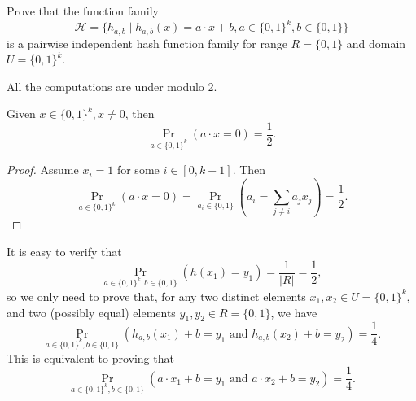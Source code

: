 \documentclass{homework}
\begin{document}
\begin{problem}
  Prove that the function family
  \begin{equation*}
    \mathcal{H} = \bigl\{ h_{a,b} \mid h_{a,b}(x) = a \cdot x + b, a\in {\{0,1\}}^{k},
    b\in \{0,1\} \bigr\}
  \end{equation*}
  is a pairwise independent hash function family for range $R = \{0,1\}$ and
  domain $U = {\{0,1\}}^{k}$.
\end{problem}

\begin{solution}

  All the computations are under modulo 2.

  \begin{lemma}
    Given $x \in \{0, 1\}^k, x \neq 0$, then
    \begin{equation*}
      \Pr_{a \in \{0, 1\}^k}(a \cdot x = 0) = \frac{1}{2}.
    \end{equation*}
  \end{lemma}

  \begin{proof}
    Assume $x_i = 1$ for some $i \in [0, k - 1]$. Then
    \begin{equation*}
      \Pr_{a \in \{0, 1\}^k}(a \cdot x = 0) = \Pr_{a_i \in \{0, 1\}}(a_i = \sum_{j \neq i}a_jx_j) = \frac{1}{2}.
    \end{equation*}
    \hfill\qedsymbol
  \end{proof}

  It is easy to verify that
  \begin{equation*}
    \Pr_{a \in \{0, 1\}^k, b \in \{0, 1\}}(h(x_1) = y_1) = \frac{1}{|R|} = \frac{1}{2},
  \end{equation*}
  so we only need to prove that, for any two distinct elements $x_1, x_2 \in U = \{0, 1\}^k$,
  and two (possibly equal) elements $y_1, y_2 \in R = \{0, 1\}$, we have
  \begin{equation*}
    \Pr_{a \in \{0, 1\}^k, b \in \{0, 1\}}(h_{a, b}(x_1) + b = y_1
    \text{ and } h_{a, b}(x_2) + b = y_2) = \frac{1}{4}.
  \end{equation*}
  This is equivalent to proving that
  \begin{equation*}
    \Pr_{a \in \{0, 1\}^k, b \in \{0, 1\}}(a \cdot x_1 + b = y_1
    \text{ and } a \cdot x_2 + b = y_2) = \frac{1}{4}.
  \end{equation*}


\end{solution}
\end{document}
